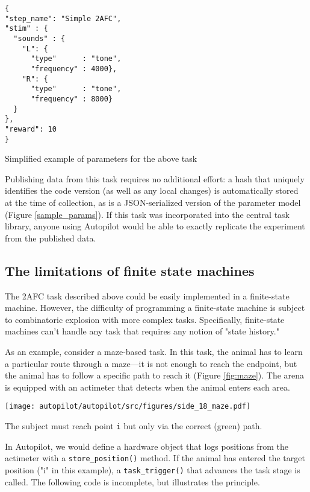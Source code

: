 \begin{marginfigure}[0cm]
\begin{verbatim}
{
"step_name": "Simple 2AFC",
"stim" : {
  "sounds" : {
    "L": {
      "type"      : "tone",
      "frequency" : 4000},
    "R": {
      "type"      : "tone",
      "frequency" : 8000}
  }
},
"reward": 10
}
\end{verbatim}
\caption{Simplified example of parameters for the above task}
\label{sample_params}
\end{marginfigure}

Publishing data from this task requires no additional effort: a hash that uniquely identifies the code version (as well as any local changes) is automatically stored at the time of collection, as is a JSON-serialized version of the parameter model (Figure \ref{sample_params}). If this task was incorporated into the central task library, anyone using Autopilot would be able to exactly replicate the experiment from the published data.


\subsection{The limitations of finite state machines}
\label{sec:fsmlimits}

The 2AFC task described above could be easily implemented in a finite-state machine. However, the difficulty of programming a finite-state machine is subject to combinatoric explosion with more complex tasks. Specifically, finite-state machines can't handle any task that requires any notion of "state history." 

As an example, consider a maze-based task. In this task, the animal has to learn a particular route through a maze---it is not enough to reach the endpoint, but the animal has to follow a specific path to reach it (Figure \ref{fig:maze}). The arena is equipped with an actimeter that detects when the animal enters each area.

\begin{marginfigure}[0.65cm]
\texttt{[image: autopilot/autopilot/src/figures/side\_18\_maze.pdf]}
\caption{The subject must reach point \texttt{i} but only via the correct (green) path.}
\label{fig:maze}
\end{marginfigure}

In Autopilot, we would define a hardware object that logs positions from the actimeter with a \texttt{store_position()} method. If the animal has entered the target position ("i" in this example), a \texttt{task_trigger()} that advances the task stage is called. The following code is incomplete, but illustrates the principle.

